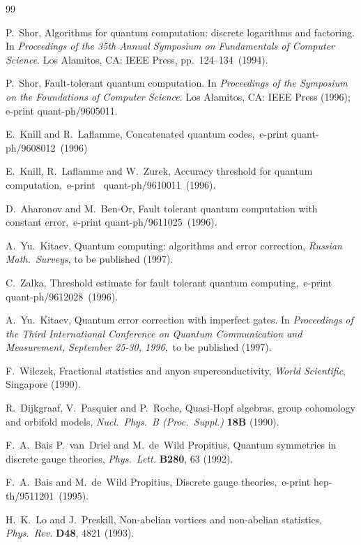 \documentclass[12pt]{article}
\begin{document}
\begin{thebibliography}{99}

 P.~Shor, Algorithms for quantum computation:
discrete logarithms and factoring. In \textit{Proceedings of the 35th Annual
Symposium on Fundamentals of Computer Science}. Los Alamitos, CA: IEEE Press,
pp.~124--134\, (1994).

 P.~Shor, Fault-tolerant quantum computation. In 
\textit{Proceedings of the Symposium on the Foundations of Computer Science}. 
Los Alamitos, CA: IEEE Press (1996);\, e-print quant-ph/9605011.

 E.~Knill and R.~Laflamme, Concatenated
quantum codes,\, e-print quant-ph/9608012\, (1996)

 E.~Knill, R.~Laflamme and W.~Zurek,  Accuracy threshold 
for quantum computation,\, e-print \, quant-ph/9610011\, (1996).

 D.~Aharonov and M.~Ben-Or, Fault tolerant quantum computation with
constant error,\, e-print quant-ph/9611025\, (1996).

 A.~Yu.~Kitaev, Quantum computing: algorithms and error 
correction, \textit{ Russian Math.\ Surveys}, to be published (1997).

 C.~Zalka, Threshold estimate for fault tolerant quantum
computing,\, e-print quant-ph/9612028\, (1996).

 A.~Yu.~Kitaev, Quantum error correction with imperfect 
gates. In \textit{Proceedings of the Third International Conference on Quantum
Communication and Measurement, September 25-30, 1996},\, to be published 
(1997).

 F.~Wilczek, Fractional statistics and anyon superconductivity,
\textit{World Scientific}, Singapore (1990).

 R.~Dijkgraaf, V.~Pasquier and P.~Roche, Quasi-Hopf algebras, group cohomology and orbifold models, \textit{Nucl.~Phys.~B (Proc.\
Suppl.)} \textbf{18B} (1990).

 F.~A.~Bais P.\ van~Driel and M.\ de~Wild Propitius, Quantum
symmetries in discrete gauge theories, \textit{Phys.~Lett.} \textbf{B280}, 63
(1992).

 F.~A.~Bais and M.\ de~Wild Propitius, Discrete gauge theories,\,
e-print hep-th/9511201\, (1995).

 H.~K.~Lo and J.~Preskill, Non-abelian vortices and non-abelian
statistics, \textit{Phys.~Rev.} \textbf{D48}, 4821 (1993).


\end{thebibliography}
\end{document}
